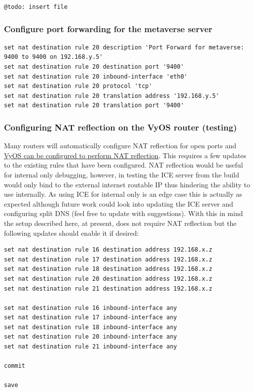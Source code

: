 \begin{verbatim}
@todo: insert file
\end{verbatim}

\hypertarget{configure-port-forwarding-for-the-metaverse-server}{%
\subsubsection{Configure port forwarding for the metaverse
server}\label{configure-port-forwarding-for-the-metaverse-server}}

\begin{verbatim}
set nat destination rule 20 description 'Port Forward for metaverse: 9400 to 9400 on 192.168.y.5'
set nat destination rule 20 destination port '9400'
set nat destination rule 20 inbound-interface 'eth0'
set nat destination rule 20 protocol 'tcp'
set nat destination rule 20 translation address '192.168.y.5'
set nat destination rule 20 translation port '9400'
\end{verbatim}

\hypertarget{configuring-nat-reflection-on-the-vyos-router-testing}{%
\subsubsection{Configuring NAT reflection on the VyOS router
(testing)}\label{configuring-nat-reflection-on-the-vyos-router-testing}}

Many routers will automatically configure NAT reflection for open ports
and
\href{https://docs.vyos.io/en/equuleus/configuration/nat/index.html\#hairpin-nat-nat-reflection}{VyOS
can be configured to perform NAT reflection}. This requires a few
updates to the existing rules that have been configured. NAT reflection
would be useful for internal only debugging, however, in testing the ICE
server from the build would only bind to the external internet routable
IP thus hindering the ability to use internally. As using ICE for
internal only is an edge case this is actually as expected although
future work could look into updating the ICE server and configuring
split DNS (feel free to update with suggestions). With this in mind the
setup described here, at present, does not require NAT reflection but
the following updates should enable it if desired:

\begin{verbatim}
set nat destination rule 16 destination address 192.168.x.z
set nat destination rule 17 destination address 192.168.x.z
set nat destination rule 18 destination address 192.168.x.z
set nat destination rule 20 destination address 192.168.x.z
set nat destination rule 21 destination address 192.168.x.z

set nat destination rule 16 inbound-interface any
set nat destination rule 17 inbound-interface any
set nat destination rule 18 inbound-interface any
set nat destination rule 20 inbound-interface any
set nat destination rule 21 inbound-interface any

commit

save
\end{verbatim}

